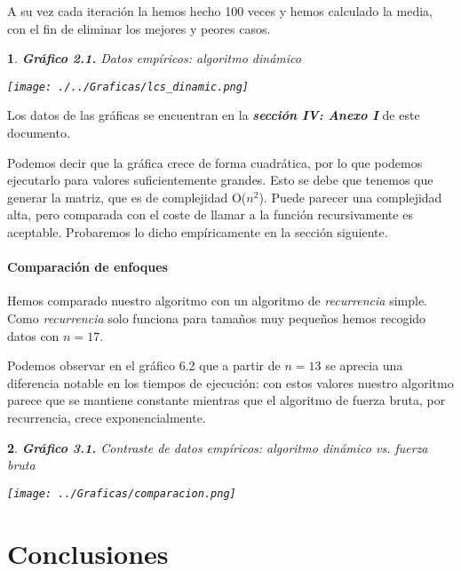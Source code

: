 \documentclass[10pt, a4paper]{article}
\theoremstyle{theorem-style}
\newtheorem*{datos}{}
\theoremstyle{theorem-style}
\theoremstyle{definition-style}
\theoremstyle{remark-style}
\theoremstyle{example-style}
\theoremstyle{definition-style}
\theoremstyle{remark-style}
\begin{document}
A su vez cada iteración la hemos hecho 100 veces y hemos calculado la media, con el fin de eliminar los mejores y peores casos.

\begin{datos}
	{\bf\sffamily Gráfico 2.1.} {\sffamily Datos empíricos: algoritmo dinámico}\\
	\vspace{-0.7cm}
	\begin{center}
		\texttt{[image: ./../Graficas/lcs\_dinamic.png]}
	\end{center}	
\end{datos}

Los datos de las gráficas se encuentran en la \textbf{\emph{sección IV: Anexo I}} de este documento.

Podemos decir que la gráfica crece de forma cuadrática, por lo que podemos ejecutarlo para valores suficientemente grandes. Esto se debe que tenemos que generar la matriz, que es de complejidad O($n^2$). Puede parecer una complejidad alta, pero comparada con el coste de llamar a la función recursivamente es aceptable. Probaremos lo dicho empíricamente en la sección siguiente.

\subsection{Comparación de enfoques}

Hemos comparado nuestro algoritmo con un algoritmo de  \emph{recurrencia} simple. Como \emph{recurrencia} solo funciona para tamaños muy pequeños hemos recogido datos con $n = 17$.

Podemos observar en el {\sffamily gráfico 6.2} que a partir de $n=13$ se aprecia una diferencia notable en los tiempos de ejecución: con estos valores nuestro algoritmo parece que se mantiene constante mientras que el algoritmo de fuerza bruta, por recurrencia, crece exponencialmente.

\begin{datos}
	{\bf\sffamily Gráfico 3.1.} {\sffamily Contraste de datos empíricos: algoritmo dinámico vs. fuerza bruta}\\
	\vspace{-0.7cm}
	\begin{center}
		\texttt{[image: ../Graficas/comparacion.png]}
	\end{center}	
\end{datos}
\pagebreak
\part{Conclusiones}
\end{document}
